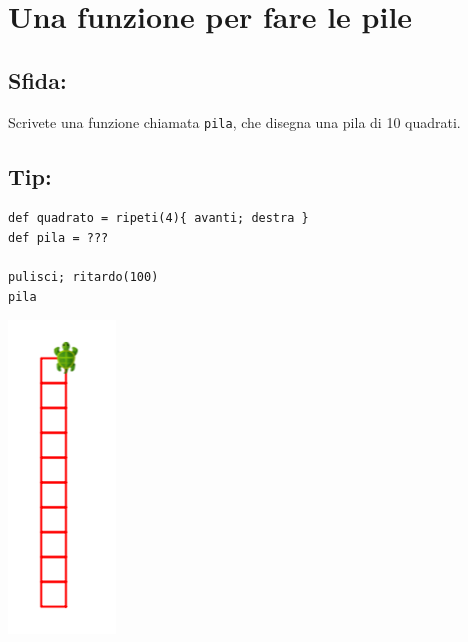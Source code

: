 \chapter{Una funzione per fare le pile}
\begin{multicols}{2}
\section*{\color{BrickRed}Sfida:}
Scrivete una funzione chiamata \lstinline{pila}, che disegna una pila di 10 quadrati.
\section*{\color{OliveGreen}Tip:}

\begin{lstlisting}[numbers=none]
def quadrato = ripeti(4){ avanti; destra }  
def pila = ???

pulisci; ritardo(100)
pila
\end{lstlisting}
        

\columnbreak

\begin{center}
\includegraphics{../img/square-column.png}
\end{center}

\end{multicols}


